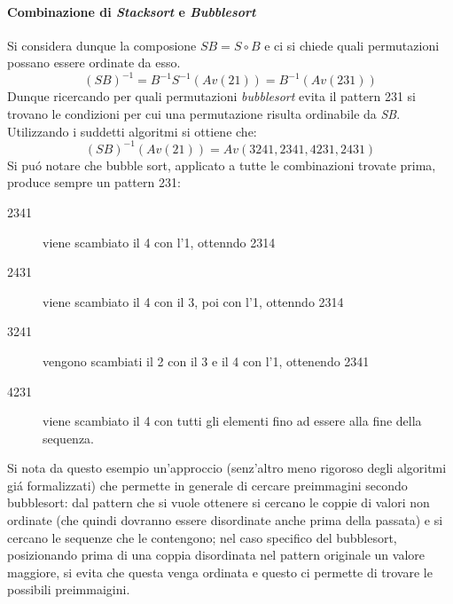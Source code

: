 \paragraph*{Combinazione di \textit{Stacksort} e \textit{Bubblesort}} Si considera dunque la composione $SB = S\circ{B}$ e ci si chiede quali permutazioni possano essere ordinate da esso.$$(SB)^{-1}=B^{-1}S^{-1}(Av(21))=B^{-1}(Av(231))$$
Dunque ricercando per quali permutazioni \textit{bubblesort} evita il pattern 231 si trovano le condizioni per cui una permutazione risulta ordinabile da \textit{SB}.\\
Utilizzando i suddetti algoritmi\cite{albert2010inverse} si ottiene che:$$(SB)^{-1}(Av(21))=Av(3241, 2341, 4231, 2431)$$
Si pu\'o notare che bubble sort, applicato a tutte le combinazioni trovate prima, produce sempre un pattern 231:
\begin{description}
\item[2341] viene scambiato il 4 con l'1, ottenndo 2314
\item[2431] viene scambiato il 4 con il 3, poi con l'1, ottenndo 2314
\item[3241] vengono scambiati il 2 con il 3 e il 4 con l'1, ottenendo 2341
\item[4231] viene scambiato il 4 con tutti gli elementi fino ad essere alla fine della sequenza.
\end{description}
Si nota da questo esempio un'approccio (senz'altro meno rigoroso degli algoritmi gi\'a formalizzati) che permette in generale di cercare preimmagini secondo bubblesort: dal pattern che si vuole ottenere si cercano le coppie di valori non ordinate (che quindi dovranno essere disordinate anche prima della passata) e si cercano le sequenze che le contengono; nel caso specifico del bubblesort, posizionando prima di una coppia disordinata nel pattern originale un valore maggiore, si evita che questa venga ordinata e questo ci permette di trovare le possibili preimmaigini.